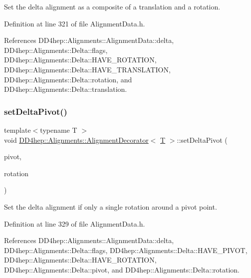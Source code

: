Set the delta alignment as a composite of a translation and a rotation. 



Definition at line 321 of file Alignment\+Data.\+h.



References D\+D4hep\+::\+Alignments\+::\+Alignment\+Data\+::delta, D\+D4hep\+::\+Alignments\+::\+Delta\+::flags, D\+D4hep\+::\+Alignments\+::\+Delta\+::\+H\+A\+V\+E\+\_\+\+R\+O\+T\+A\+T\+I\+ON, D\+D4hep\+::\+Alignments\+::\+Delta\+::\+H\+A\+V\+E\+\_\+\+T\+R\+A\+N\+S\+L\+A\+T\+I\+ON, D\+D4hep\+::\+Alignments\+::\+Delta\+::rotation, and D\+D4hep\+::\+Alignments\+::\+Delta\+::translation.

\hypertarget{class_d_d4hep_1_1_alignments_1_1_alignment_decorator_aa162f47918e614d0c3c11e6b584d1a1b}{}\label{class_d_d4hep_1_1_alignments_1_1_alignment_decorator_aa162f47918e614d0c3c11e6b584d1a1b} 
\subsubsection{\texorpdfstring{set\+Delta\+Pivot()}{setDeltaPivot()}\hspace{0.1cm}{\footnotesize\ttfamily [1/2]}}
{\footnotesize\ttfamily template$<$typename T $>$ \\
void \hyperlink{class_d_d4hep_1_1_alignments_1_1_alignment_decorator}{D\+D4hep\+::\+Alignments\+::\+Alignment\+Decorator}$<$ \hyperlink{class_t}{T} $>$\+::set\+Delta\+Pivot (\begin{DoxyParamCaption}\item[{const Translation3D \&}]{pivot,  }\item[{const Rotation\+Z\+YX \&}]{rotation }\end{DoxyParamCaption})\hspace{0.3cm}{\ttfamily [inline]}}



Set the delta alignment if only a single rotation around a pivot point. 



Definition at line 329 of file Alignment\+Data.\+h.



References D\+D4hep\+::\+Alignments\+::\+Alignment\+Data\+::delta, D\+D4hep\+::\+Alignments\+::\+Delta\+::flags, D\+D4hep\+::\+Alignments\+::\+Delta\+::\+H\+A\+V\+E\+\_\+\+P\+I\+V\+OT, D\+D4hep\+::\+Alignments\+::\+Delta\+::\+H\+A\+V\+E\+\_\+\+R\+O\+T\+A\+T\+I\+ON, D\+D4hep\+::\+Alignments\+::\+Delta\+::pivot, and D\+D4hep\+::\+Alignments\+::\+Delta\+::rotation.

